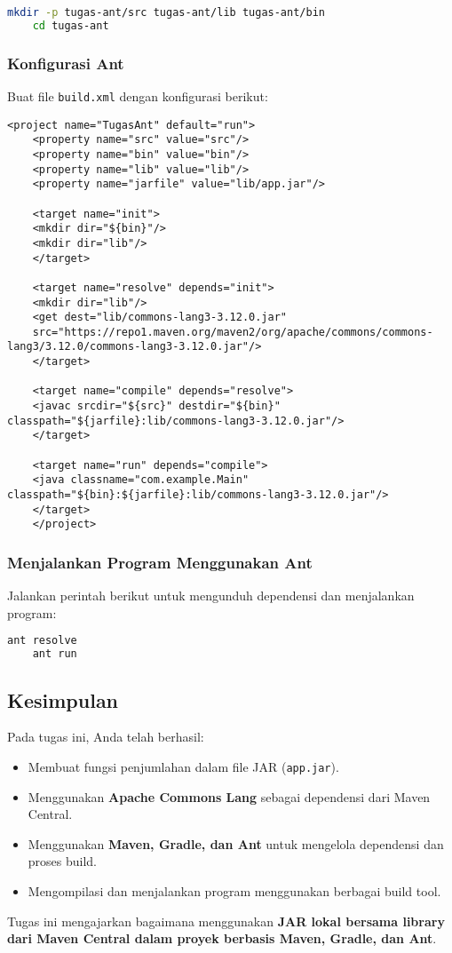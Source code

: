 \begin{lstlisting}[language=bash]
	mkdir -p tugas-ant/src tugas-ant/lib tugas-ant/bin
	cd tugas-ant
\end{lstlisting}

\subsubsection{Konfigurasi Ant}
Buat file \texttt{build.xml} dengan konfigurasi berikut:

\begin{lstlisting}[style=XmlStyle]
	<project name="TugasAnt" default="run">
	<property name="src" value="src"/>
	<property name="bin" value="bin"/>
	<property name="lib" value="lib"/>
	<property name="jarfile" value="lib/app.jar"/>
	
	<target name="init">
	<mkdir dir="${bin}"/>
	<mkdir dir="lib"/>
	</target>
	
	<target name="resolve" depends="init">
	<mkdir dir="lib"/>
	<get dest="lib/commons-lang3-3.12.0.jar"
	src="https://repo1.maven.org/maven2/org/apache/commons/commons-lang3/3.12.0/commons-lang3-3.12.0.jar"/>
	</target>
	
	<target name="compile" depends="resolve">
	<javac srcdir="${src}" destdir="${bin}" classpath="${jarfile}:lib/commons-lang3-3.12.0.jar"/>
	</target>
	
	<target name="run" depends="compile">
	<java classname="com.example.Main" classpath="${bin}:${jarfile}:lib/commons-lang3-3.12.0.jar"/>
	</target>
	</project>
\end{lstlisting}

\subsubsection{Menjalankan Program Menggunakan Ant}
Jalankan perintah berikut untuk mengunduh dependensi dan menjalankan program:

\begin{lstlisting}[language=bash]
	ant resolve
	ant run
\end{lstlisting}

\subsection{Kesimpulan}
Pada tugas ini, Anda telah berhasil:
\begin{itemize}
	\item Membuat fungsi penjumlahan dalam file JAR (\texttt{app.jar}).
	\item Menggunakan \textbf{Apache Commons Lang} sebagai dependensi dari Maven Central.
	\item Menggunakan \textbf{Maven, Gradle, dan Ant} untuk mengelola dependensi dan proses build.
	\item Mengompilasi dan menjalankan program menggunakan berbagai build tool.
\end{itemize}

Tugas ini mengajarkan bagaimana menggunakan \textbf{JAR lokal bersama library dari Maven Central dalam proyek berbasis Maven, Gradle, dan Ant}.
